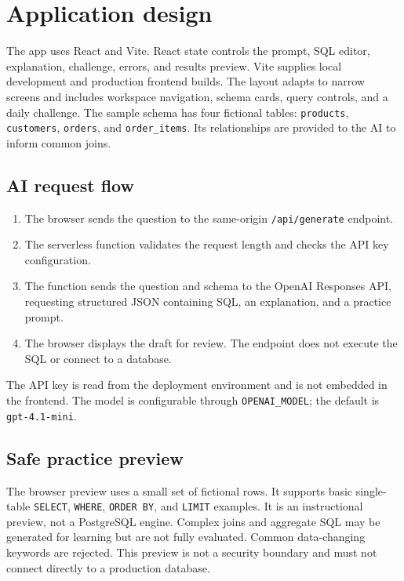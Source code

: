 \documentclass[11pt]{article}
\begin{document}
\section{Application design}
The app uses React and Vite. React state controls the prompt, SQL editor, explanation, challenge, errors, and results preview. Vite supplies local development and production frontend builds. The layout adapts to narrow screens and includes workspace navigation, schema cards, query controls, and a daily challenge.
The sample schema has four fictional tables: \texttt{products}, \texttt{customers}, \texttt{orders}, and \texttt{order\_items}. Its relationships are provided to the AI to inform common joins.
\subsection{AI request flow}
\begin{enumerate}[leftmargin=1.6em,itemsep=3pt]\item The browser sends the question to the same-origin \texttt{/api/generate} endpoint.\item The serverless function validates the request length and checks the API key configuration.\item The function sends the question and schema to the OpenAI Responses API, requesting structured JSON containing SQL, an explanation, and a practice prompt.\item The browser displays the draft for review. The endpoint does not execute the SQL or connect to a database.\end{enumerate}
The API key is read from the deployment environment and is not embedded in the frontend. The model is configurable through \texttt{OPENAI\_MODEL}; the default is \texttt{gpt-4.1-mini}.
\subsection{Safe practice preview}
The browser preview uses a small set of fictional rows. It supports basic single-table \texttt{SELECT}, \texttt{WHERE}, \texttt{ORDER BY}, and \texttt{LIMIT} examples. It is an instructional preview, not a PostgreSQL engine. Complex joins and aggregate SQL may be generated for learning but are not fully evaluated. Common data-changing keywords are rejected. This preview is not a security boundary and must not connect directly to a production database.
\end{document}

